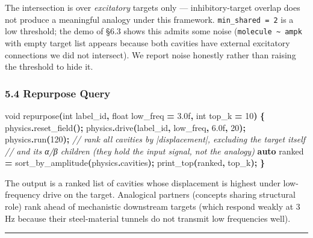 \documentclass[
  11pt,
  a4paper,
]{article}
\newenvironment{Shaded}{\begin{snugshade}}{\end{snugshade}}
\newcommand{\BuiltInTok}[1]{#1}
\newcommand{\CommentTok}[1]{\textcolor[rgb]{0.56,0.35,0.01}{\textit{#1}}}
\newcommand{\DataTypeTok}[1]{\textcolor[rgb]{0.13,0.29,0.53}{#1}}
\newcommand{\DecValTok}[1]{\textcolor[rgb]{0.00,0.00,0.81}{#1}}
\newcommand{\FloatTok}[1]{\textcolor[rgb]{0.00,0.00,0.81}{#1}}
\newcommand{\KeywordTok}[1]{\textcolor[rgb]{0.13,0.29,0.53}{\textbf{#1}}}
\newcommand{\NormalTok}[1]{#1}
\newcommand{\OperatorTok}[1]{\textcolor[rgb]{0.81,0.36,0.00}{\textbf{#1}}}
\begin{document}
The intersection is over \emph{excitatory} targets only ---
inhibitory-target overlap does not produce a meaningful analogy under
this framework. \texttt{min\_shared\ =\ 2} is a low threshold; the demo
of §6.3 shows this admits some noise
(\texttt{molecule\ \textasciitilde{}\ ampk} with empty target list
appears because both cavities have external excitatory connections we
did not intersect). We report noise honestly rather than raising the
threshold to hide it.

\subsubsection{5.4 Repurpose Query}\label{repurpose-query}

\begin{Shaded}
\begin{Highlighting}[]
\DataTypeTok{void}\NormalTok{ repurpose}\OperatorTok{(}\DataTypeTok{int}\NormalTok{ label\_id}\OperatorTok{,} \DataTypeTok{float}\NormalTok{ low\_freq }\OperatorTok{=} \FloatTok{3.0}\BuiltInTok{f}\OperatorTok{,} \DataTypeTok{int}\NormalTok{ top\_k }\OperatorTok{=} \DecValTok{10}\OperatorTok{)} \OperatorTok{\{}
\NormalTok{    physics}\OperatorTok{.}\NormalTok{reset\_field}\OperatorTok{();}
\NormalTok{    physics}\OperatorTok{.}\NormalTok{drive}\OperatorTok{(}\NormalTok{label\_id}\OperatorTok{,}\NormalTok{ low\_freq}\OperatorTok{,} \FloatTok{6.0}\BuiltInTok{f}\OperatorTok{,} \DecValTok{20}\OperatorTok{);}
\NormalTok{    physics}\OperatorTok{.}\NormalTok{run}\OperatorTok{(}\DecValTok{120}\OperatorTok{);}
    \CommentTok{// rank all cavities by |displacement|, excluding the target itself}
    \CommentTok{// and its α/β children (they hold the input signal, not the analogy)}
    \KeywordTok{auto}\NormalTok{ ranked }\OperatorTok{=}\NormalTok{ sort\_by\_amplitude}\OperatorTok{(}\NormalTok{physics}\OperatorTok{.}\NormalTok{cavities}\OperatorTok{);}
\NormalTok{    print\_top}\OperatorTok{(}\NormalTok{ranked}\OperatorTok{,}\NormalTok{ top\_k}\OperatorTok{);}
\OperatorTok{\}}
\end{Highlighting}
\end{Shaded}

The output is a ranked list of cavities whose displacement is highest
under low-frequency drive on the target. Analogical partners (concepts
sharing structural role) rank ahead of mechanistic downstream targets
(which respond weakly at 3 Hz because their steel-material tunnels do
not transmit low frequencies well).

\begin{center}\rule{0.5\linewidth}{0.5pt}\end{center}
\end{document}
